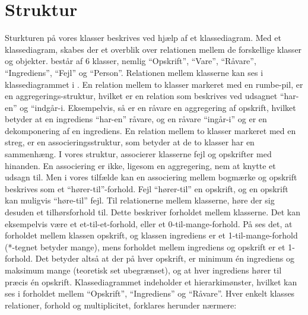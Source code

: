\section{Struktur}
\label{sec:struktur}

Sturkturen på vores klasser beskrives ved hjælp af et klassediagram. Med et klassediagram, skabes der et overblik over relationen mellem de forskellige klasser og objekter. \Foodl{} består af 6 klasser, nemlig ``Opskrift'', ``Vare'', ``Råvare'', ``Ingrediens'', ``Fejl'' og ``Person''. Relationen mellem klasserne kan ses i klassediagrammet i . En relation mellem to klasser markeret med en rumbe-pil, er en aggregerings-struktur, hvilket er en relation som beskrives ved udsagnet ``har-en'' og ``indgår-i. Eksempelvis, så er en råvare en aggregering af opskrift, hvilket betyder at en ingrediens ``har-en'' råvare, og en råvare ``ingår-i'' og er en dekomponering af en ingrediens. En relation mellem to klasser markeret med en streg, er en associeringsstruktur, som betyder at de to klasser har en sammenhæng. I vores struktur, associerer klasserne fejl og opskrifter med hinanden. En associering er ikke, ligesom en aggregering, nem at knytte et udsagn til. Men i vores tilfælde kan en associering mellem bogmærke og opskrift beskrives som et ``hører-til''-forhold. Fejl ``hører-til'' en opskrift, og en opskrift kan muligvis ``høre-til'' fejl. Til relationerne mellem klasserne, høre der sig desuden et tilhørsforhold til. Dette beskriver forholdet mellem klasserne. Det kan eksempelvis være et et-til-et-forhold, eller et 0-til-mange-forhold. På  ses det, at forholdet mellem klassen opskrift, og klassen ingrediens er et 1-til-mange-forhold (*-tegnet betyder mange), mens forholdet mellem ingrediens og opskrift er et 1-forhold. Det betyder altså at der på hver opskrift, er minimum én ingrediens og maksimum mange (teoretisk set ubegrænset), og at hver ingrediens hører til præcis én opskrift. Klassediagrammet indeholder et hierarkimønster, hvilket kan ses i forholdet mellem ``Opskrift'', ``Ingrediens'' og ``Råvare''. Hver enkelt klasses relationer, forhold og multiplicitet, forklares herunder nærmere:



